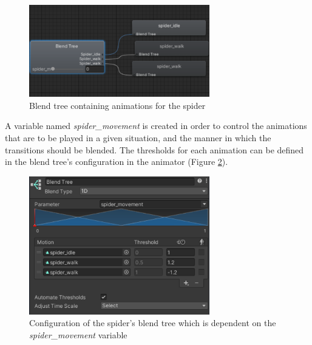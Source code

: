 \begin{figure}[h!]
    \centering
    \includegraphics[width=0.7\textwidth]{grafika/spider_blend.png}
    \caption{Blend tree containing animations for the spider}
    \label{fig:s_blendtree}
\end{figure}

A variable named \textit{spider\_movement} is created in order to control the
animations that are to be played in a given situation, and the manner in which
the transitions should be blended. The thresholds for each animation can be
defined in the blend tree's configuration in the animator (Figure \ref{fig:s_blendconf}).

\begin{figure}[h!]
    \centering
    \captionsetup{justification=centering}
    \includegraphics[width=0.7\textwidth]{grafika/spider_blendconf.png}
    \caption{Configuration of the spider's blend tree which is dependent on
    the \textit{spider\_movement} variable}
    \label{fig:s_blendconf}
\end{figure}

